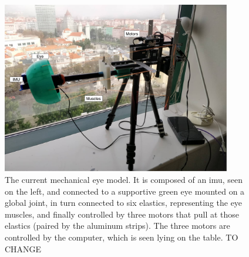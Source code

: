 \begin{figure}[ht]
	\centering
	\includegraphics[width=10cm]{images/prototype.pdf}
	\caption[Current mechanical eye model]{The current mechanical eye model. It is composed of an  \acrshort{imu}, seen on the left, and connected to a supportive green eye mounted on a global joint, in turn connected to six elastics, representing the eye muscles, and finally controlled by three motors that pull at those elastics (paired by the aluminum strips). The three motors are controlled by the computer, which is seen lying on the table. TO CHANGE}
	\label{cha1:sec1:fig:curr_eye_model}
\end{figure}

